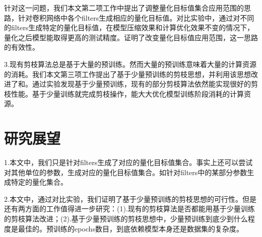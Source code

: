 \documentclass[ pdftex, oneside, master]{NJUthesis}
\begin{document}
针对这一问题，我们本文第二项工作中提出了调整量化目标值集合应用范围的思路，针对卷积网络中各个filters生成相应的量化目标值。对比实验中，通过对不同的filters生成特定的量化目标值，在模型压缩效果和计算优化效果不变的情况下，量化之后模型能取得更高的测试精度。证明了改变量化目标值应用范围，这一思路的有效性。

3.现有剪枝算法总是基于大量的预训练。然而大量的预训练意味着大量的计算资源的消耗。我们本文第三项工作提出了基于少量预训练的剪枝思想，并利用该思想改进了\cite{17}和\cite{27}。通过实验发现基于少量预训练，现有的部分剪枝算法依然能实现很好的剪枝性能。基于少量训练就完成剪枝操作，能大大优化模型训练阶段消耗的计算资源。


\section{研究展望}
1.本文中，我们只是针对filters生成了对应的量化目标值集合。事实上还可以尝试对其他单位的参数，生成对应的量化目标值集合。如针对filters中的某部分参数生成特定的量化集合。

2.本文中，通过对比实验，我们证明了基于少量预训练的剪枝思想的可行性。但是还有两方面的工作值得进一步研究：(1).现有的剪枝算法是否都能用基于少量训练的剪枝算法改进；(2).基于少量预训练的剪枝思想中，少量预训练到底少到什么程度是最佳的。预训练的epochs数目，到底依赖模型本身还是数据集的复杂度。





\backmatter



%
%




\begin{thanks}
\vskip 18pt


\end{thanks}
\end{document}
